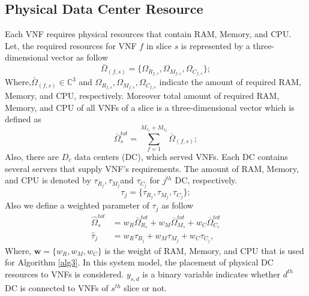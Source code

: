 \documentclass[conference]{IEEEtran}
\begin{document}
\subsection{Physical Data Center Resource}
Each VNF requires
physical resources that contain RAM, Memory, and CPU.
Let, the required resources for VNF $f$ in slice $s$ is represented by a three-dimensional vector as follow
\begin{equation}
\bar{\Omega}_{(f,s)} = \{\Omega_{R_{f,s}}, \Omega_{M_{f,s}}, \Omega_{C_{f,s}} \};
\end{equation} 
Where,$\bar{\Omega}_{(f,s)}\in \mathbb{C}^{3}$ and $\Omega_{R_{f,s}}, \Omega_{M_{f,s}}, \Omega_{C_{f,s}}$ indicate the amount of required RAM, Memory, and CPU, respectively.
Moreover total amount of required RAM, Memory, and CPU of all VNFs of a slice is a three-dimensional vector which is defined as
\begin{equation}
\bar{\Omega}_{s}^{tot} = \sum_{f=1}^{M_{s_1} + M_{s_2}}\bar{\Omega}_{(f,s)};
\end{equation}
Also, there are $D_c$ data centers (DC), which served VNFs. Each DC contains several servers that supply VNF's requirements.
The amount of RAM, Memory, and CPU is denoted by $\tau_{R_{j}}, \tau_{M_{j}}$and $\tau_{C_{j}} $ for $j^{th}$ DC, respectively.
\begin{equation*}
\tau_j = \{\tau_{R_{j}}, \tau_{M_{j}}, \tau_{C_{j}} \};
\end{equation*}
Also we define a weighted parameter of $\tau_j$ as follow
\begin{equation}\label{wt}
\begin{split}
\hat{\Omega}_{s}^{tot} &= w_R \bar{\Omega}_{R_s}^{tot} + w_M \bar{\Omega}_{M_s}^{tot} + w_C \bar{\Omega}_{C_s}^{tot} \\
\hat{\tau}_j &= w_R \tau_{R_{j}} + w_M \tau_{M_{j}} + w_C \tau_{C_{j}},
\end{split}
\end{equation}
Where, $\boldsymbol{w} = \{w_R, w_M, w_C\}$ is the weight of RAM, Memory, and CPU that is used for Algorithm \ref{alg3}.
In this system model, the placement of physical DC resources to VNFs is considered. $y_{s,d}$ is a binary variable indicates whether $d^{th}$ DC is connected to VNFs of $s^{th}$ slice or not.
\end{document}
